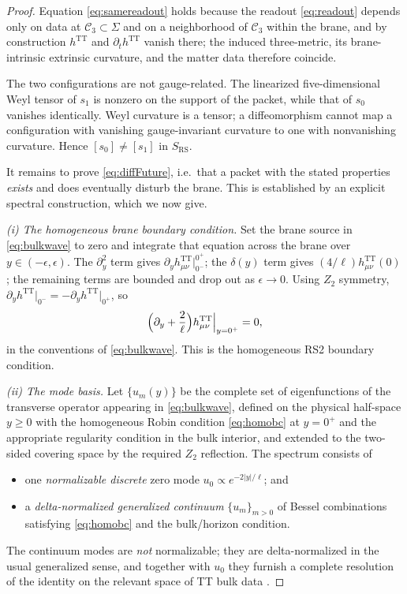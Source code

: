 \documentclass[11pt,a4paper]{article}
\theoremstyle{plain}
\theoremstyle{definition}
\newcommand{\TT}{\mathrm{TT}}
\newcommand{\RS}{\mathrm{RS}}
\begin{document}
\begin{proof}
Equation \eqref{eq:samereadout} holds because the readout
\eqref{eq:readout} depends only on data at $\mathcal C_3\subset\Sigma$
and on a neighborhood of $\mathcal C_3$ within the brane, and by
construction $h^{\TT}$ and $\partial_t h^{\TT}$ vanish there; the induced
three-metric, its brane-intrinsic extrinsic curvature, and the matter
data therefore coincide.

The two configurations are not gauge-related. The linearized
five-dimensional Weyl tensor of $s_1$ is nonzero on the support of the
packet, while that of $s_0$ vanishes identically. Weyl curvature is a
tensor; a diffeomorphism cannot map a configuration with vanishing
gauge-invariant curvature to one with nonvanishing curvature. Hence
$[s_0]\ne[s_1]$ in $S_{\RS}$.

It remains to prove \eqref{eq:diffFuture}, i.e.\ that a packet with the
stated properties \emph{exists} and does eventually disturb the brane.
This is established by an explicit spectral construction, which we now
give.

\emph{(i) The homogeneous brane boundary condition.} Set the brane source
in \eqref{eq:bulkwave} to zero and integrate that equation across the
brane over $y\in(-\epsilon,\epsilon)$. The $\partial_y^2$ term gives
$\partial_yh^{\TT}_{\mu\nu}\big|_{0^-}^{0^+}$; the $\delta(y)$ term gives
$(4/\ell)h^{\TT}_{\mu\nu}(0)$; the remaining terms are bounded and drop
out as $\epsilon\to0$. Using $Z_2$ symmetry,
$\partial_yh^{\TT}\big|_{0^-}=-\partial_yh^{\TT}\big|_{0^+}$, so
\begin{equation}
\label{eq:homobc}
\Bigl(\partial_y+\frac{2}{\ell}\Bigr)h^{\TT}_{\mu\nu}\Big|_{y=0^+}=0 ,
\end{equation}
in the conventions of \eqref{eq:bulkwave}. This is the homogeneous RS2
boundary condition.

\emph{(ii) The mode basis.} Let $\{u_m(y)\}$ be the complete set of
eigenfunctions of the transverse operator appearing in
\eqref{eq:bulkwave}, defined on the physical half-space $y\ge0$ with the
homogeneous Robin condition \eqref{eq:homobc} at $y=0^+$ and the
appropriate regularity condition in the bulk interior, and extended to the
two-sided covering space by the required $Z_2$ reflection. The spectrum
consists of
\begin{itemize}[leftmargin=*]
\item one \emph{normalizable discrete} zero mode
$u_0\propto e^{-2|y|/\ell}$; and
\item a \emph{delta-normalized generalized continuum} $\{u_m\}_{m>0}$ of
Bessel combinations satisfying \eqref{eq:homobc} and the bulk/horizon
condition.
\end{itemize}
The continuum modes are \emph{not} normalizable; they are delta-normalized
in the usual generalized sense, and together with $u_0$ they furnish a
complete resolution of the identity on the relevant space of TT bulk data
\cite{RS2,GarrigaTanaka,GKR}.


\end{proof}
\end{document}
